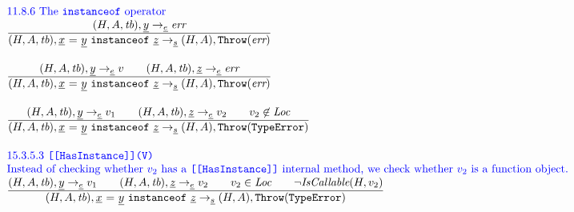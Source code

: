 \documentclass[a4paper, leqno]{amsart}
\newcommand{\rulesep}{\quad\quad}
\newcommand{\stmt}{s}
\newcommand{\expr}{e}
\newcommand{\ir}[1]{\ensuremath{\underline{#1}}}
\newcommand{\irid}{\ir{x}}
\def\inblue{\color{blue}}
\newcommand{\tb}{\emph{tb}}
\newcommand{\err}{\emph{err}}
\newcommand{\te}{{\tt TypeError}}
\newcommand{\Loc}{\emph{Loc}}
\newcommand{\hf}[1]{\emph{#1}}
\newcommand{\error}{\ensuremath{{\tt Throw}(\err)}}
\newcommand{\thte}{\ensuremath{{\tt Throw}(\te)}}
\newcommand{\state}{\ensuremath{(H,A,\tb)}}
\newcommand{\res}{\ensuremath{(H,A)}}
\newcommand{\evale}{\ensuremath{(H,A,\tb)}}
\def\inblue{\color{blue}}
\begin{document}
\[
\begin{array}{l@{~~}l@{~~}ll}

\mbox{\inblue 11.8.6 The {\tt instanceof} operator}\\

\frac{\begin{matrix}
\evale, \ir{y} \rightarrow_{\ir\expr} \err
\end{matrix}}{\begin{matrix}
\state, \irid \ {\tt =} \ \ir{y} \ {\tt instanceof}\ \ir{z}
\rightarrow_{\ir\stmt}
\res, \error
\end{matrix}}
\\[2em]

\frac{\begin{matrix}
\evale, \ir{y} \rightarrow_{\ir\expr} v
\rulesep
\evale, \ir{z} \rightarrow_{\ir\expr} \err
\end{matrix}}{\begin{matrix}
\state, \irid \ {\tt =} \ \ir{y} \ {\tt instanceof}\ \ir{z}
\rightarrow_{\ir\stmt}
\res, \error
\end{matrix}}
\\[2em]

\frac{\begin{matrix}
\evale, \ir{y} \rightarrow_{\ir\expr} v_1
\rulesep
\evale, \ir{z} \rightarrow_{\ir\expr} v_2
\rulesep
v_2 \not\in \Loc
\end{matrix}}{\begin{matrix}
\state, \irid \ {\tt =} \ \ir{y} \ {\tt instanceof}\ \ir{z}
\rightarrow_{\ir\stmt}
\res, \thte
\end{matrix}}
\\[2em]

\mbox{\inblue 15.3.5.3 {\tt [[HasInstance]](V)}}\\
\mbox{\inblue Instead of checking whether $v_2$ has a {\tt [[HasInstance]]} internal method,
we check whether $v_2$ is a function object.}\\
\frac{\begin{matrix}
\evale, \ir{y} \rightarrow_{\ir\expr} v_1
\rulesep
\evale, \ir{z} \rightarrow_{\ir\expr} v_2
\rulesep
v_2 \in \Loc
\rulesep
\neg\hf{IsCallable}(H,v_2)
\end{matrix}}{\begin{matrix}
\state, \irid \ {\tt =} \ \ir{y} \ {\tt instanceof}\ \ir{z}
\rightarrow_{\ir\stmt}
\res, \thte
\end{matrix}}
\\[2em]



\end{array}\]
\end{document}
